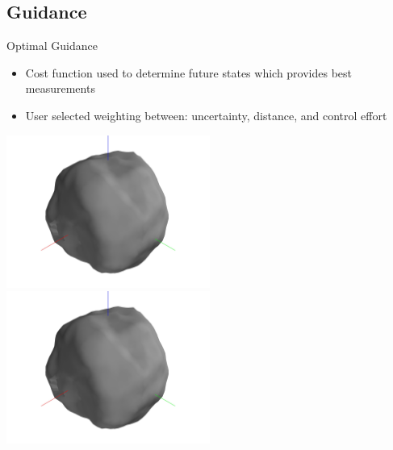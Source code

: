 \subsection{Guidance}
\begin{frame}{Optimal Guidance}
    \begin{itemize}
        \item Cost function used to determine future states which provides best measurements
        \item User selected weighting between: uncertainty, distance, and control effort
    \end{itemize}
\begin{center}
        \href{https://youtu.be/ZJY9nPXhyxw}{\includegraphics[trim={20cm 8cm 20cm 8cm},clip,keepaspectratio,width=0.5\textwidth,height=0.6\textheight]{figures/computational_geometry/dynamic_exploration/52760/partial_14998.jpg}}%
        \href{https://youtu.be/VF8dp8D5nVA}{\includegraphics[trim={20cm 8cm 20cm 8cm},clip,keepaspectratio,width=0.5\textwidth,height=0.6\textheight]{figures/computational_geometry/dynamic_exploration/52760/partial_14998.jpg}}
\end{center}
\end{frame}

